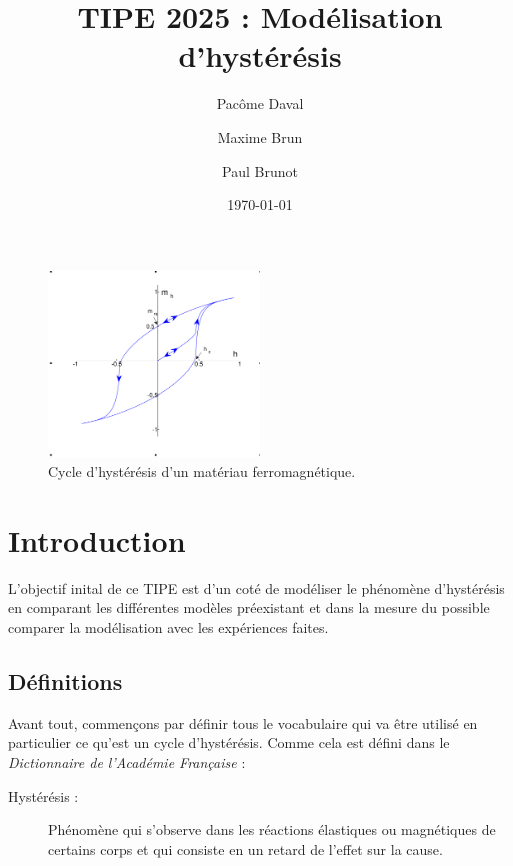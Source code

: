 \documentclass[11pt]{article}
\begin{document}
\title{TIPE 2025 : Modélisation d'hystérésis}
\author{Pacôme Daval \and Maxime Brun \and Paul Brunot}
\date{\today}
\maketitle

\begin{figure}[H]
    \centering
    \includegraphics[width=0.5\textwidth]{Hysteresiscurve.png}
    \caption{Cycle d'hystérésis d'un matériau ferromagnétique.}
    \label{fig:hysteresis_title}
\end{figure}

\newpage

\tableofcontents
\newpage

\section{Introduction}

L'objectif inital de ce TIPE est d'un coté de modéliser le phénomène d'hystérésis en comparant les différentes
modèles préexistant et dans la mesure du possible comparer la modélisation avec les expériences faites.

\subsection{Définitions}
Avant tout, commençons par définir tous le vocabulaire qui va être utilisé en particulier ce qu'est un cycle d'hystérésis.
Comme cela est défini dans le \textit{Dictionnaire de l'Académie Française} : 
\begin{description}
    \item[Hystérésis :] Phénomène qui s'observe dans les réactions élastiques ou magnétiques de certains corps et qui consiste en un retard de l'effet sur la cause. \cite{francaiseHysteresisDictionnaireLAcademie}
\end{description}
\end{document}
